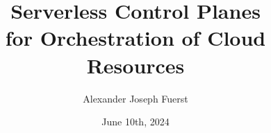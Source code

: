 \documentclass[11pt]{thesis}
\begin{document}
\title{%
  Serverless Control Planes \\ for Orchestration of Cloud Resources
  }
\author{Alexander Joseph Fuerst}
\date{June 10th, 2024}



\beforepreface

\afterpreface


















\cvsection
\end{document}
